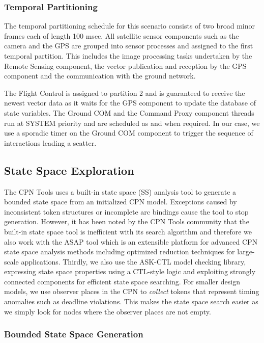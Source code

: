 \subsubsection{Temporal Partitioning}

The temporal partitioning schedule for this scenario consists of two broad minor frames each of length 100 msec. All satellite sensor components such as the camera and the GPS are grouped into sensor processes and assigned to the first temporal partition. This includes the image processing tasks undertaken by the Remote Sensing component, the vector publication and reception by the GPS component and the communication with the ground network. 

The Flight Control is assigned to partition 2 and is guaranteed to receive the newest vector data as it waits for the GPS component to update the database of state variables. The Ground COM and the Command Proxy component threads run at SYSTEM priority and are scheduled as and when required. In our case, we use a sporadic timer on the Ground COM component to trigger the sequence of interactions leading a scatter.


\subsection{State Space Exploration}


The CPN Tools uses a built-in state space (SS) analysis tool to generate a bounded state space from an initialized CPN model. Exceptions caused by inconsistent token structures or incomplete arc bindings cause the tool to stop generation. However, it has been noted by the CPN Tools community that the built-in state space tool is inefficient with its search algorithm \cite{CPNTwoInterfaces} and therefore we also work with the ASAP tool \cite{ASAP} which is an extensible platform for advanced CPN state space analysis methods including optimized reduction techniques for large-scale applications. Thirdly, we also use the ASK-CTL \cite{ASK-CTL} model checking library, expressing state space properties using a CTL-style logic and exploiting strongly connected components for efficient state space searching. For smaller design models, we use observer places \cite{Alpern1989} in the CPN to \emph{collect} tokens that represent timing anomalies such as deadline violations. This makes the state space search easier as we simply look for nodes where the observer places are not empty. 

\subsubsection{Bounded State Space Generation}

